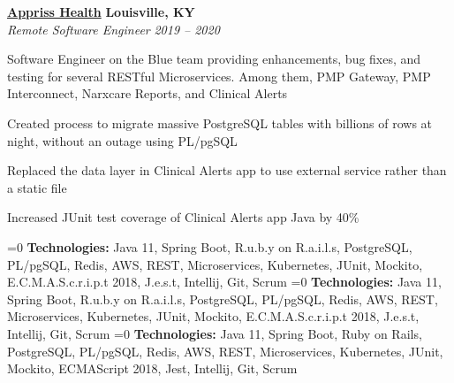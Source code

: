 %
    \headerrow
        {\textbf{\href{https://apprisshealth.com/}{Appriss Health}}}
        {\textbf{Louisville, KY}}
    \\
    \headerrow
        {\emph{Remote Software Engineer}}
        {\emph{2019 -- 2020}}
    \begin{itemize*}
        \item Software Engineer on the Blue team providing enhancements, bug fixes, and testing for several RESTful Microservices.
            Among them, PMP Gateway, PMP Interconnect, Narxcare Reports, and Clinical Alerts
        \item Created process to migrate massive PostgreSQL tables with billions of rows at night, without an outage using PL/pgSQL
        \item Replaced the data layer in Clinical Alerts app to use external service rather than a static file
        \item Increased JUnit test coverage of Clinical Alerts app Java by 40\%
    \end{itemize*}

    \ifnum{}=0
    \hspace{1.0em}
        {\textbf{Technologies:} Java 11, Spring Boot, R.u.b.y on R.a.i.l.s, PostgreSQL, PL/pgSQL, Redis, AWS,
        REST, Microservices, Kubernetes, JUnit, Mockito, E.C.M.A.S.c.r.i.p.t 2018, J.e.s.t, Intellij, Git, Scrum}
    \fi
    \ifnum{}=0
    \hspace{1.0em}
        {\textbf{Technologies:} Java 11, Spring Boot, R.u.b.y on R.a.i.l.s, PostgreSQL, PL/pgSQL, Redis, AWS,
        REST, Microservices, Kubernetes, JUnit, Mockito, E.C.M.A.S.c.r.i.p.t 2018, J.e.s.t, Intellij, Git, Scrum}
    \fi
    \ifnum{}=0
    \hspace{1.0em}
        {\textbf{Technologies:} Java 11, Spring Boot, Ruby on Rails, PostgreSQL, PL/pgSQL, Redis, AWS,
        REST, Microservices, Kubernetes, JUnit, Mockito, ECMAScript 2018, Jest, Intellij, Git, Scrum}
    \fi



